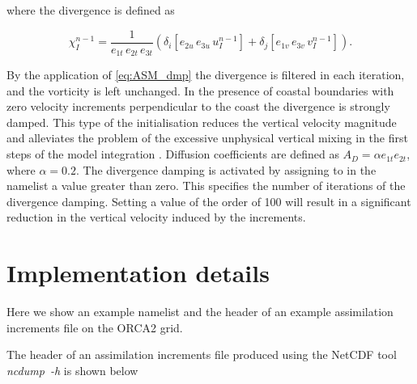 \documentclass[../main/NEMO_manual]{subfiles}
\begin{document}
where the divergence is defined as

\[
  \chi^{n-1}_I = \frac{1}{e_{1t}\,e_{2t}\,e_{3t} }
  \left( {\delta_i \left[ {e_{2u}\,e_{3u}\,u^{n-1}_I} \right]
      +\delta_j \left[ {e_{1v}\,e_{3v}\,v^{n-1}_I} \right]} \right).
\]

By the application of \autoref{eq:ASM_dmp} the divergence is filtered in each iteration,
and the vorticity is left unchanged.
In the presence of coastal boundaries with zero velocity increments perpendicular to the coast
the divergence is strongly damped.
This type of the initialisation reduces the vertical velocity magnitude and
alleviates the problem of the excessive unphysical vertical mixing in the first steps of the model integration
\citep{talagrand_JAS72, dobricic.pinardi.ea_OS07}.
Diffusion coefficients are defined as $A_D = \alpha e_{1t} e_{2t}$, where $\alpha = 0.2$.
The divergence damping is activated by assigning to  in the  namelist
a value greater than zero.
This specifies the number of iterations of the divergence damping. Setting a value of the order of 100 will result in a significant reduction in the vertical velocity induced by the increments.

\section{Implementation details}
\label{sec:ASM_details}

Here we show an example  namelist and the header of an example assimilation increments file on
the ORCA2 grid.

\begin{listing}
  \caption{}
  \label{lst:nam_asminc}
\end{listing}

The header of an assimilation increments file produced using the NetCDF tool
\mbox{\textit{ncdump~-h}} is shown below
\end{document}

